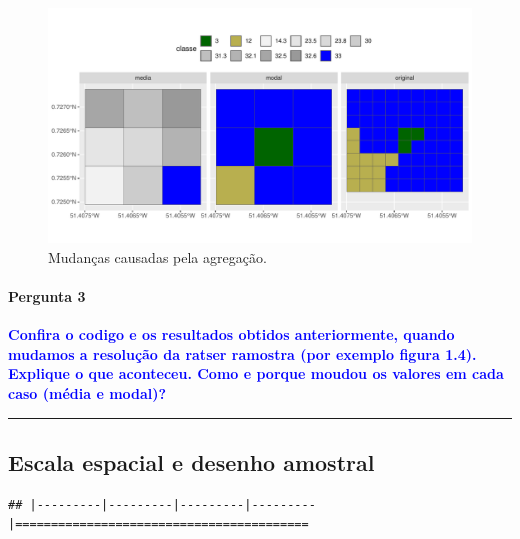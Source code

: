 \documentclass[
]{article}
\begin{document}
\begin{figure}
\centering
\includegraphics{epr_files/figure-latex/fig-mud-agg-1.pdf}
\caption{\label{fig:fig-mud-agg}Mudanças causadas pela agregação.}
\end{figure}

\hypertarget{pergunta-3}{%
\paragraph{Pergunta 3}\label{pergunta-3}}

\textcolor{blue}{\textbf{Confira o codigo e os resultados obtidos anteriormente, quando mudamos a resolução da ratser ramostra (por exemplo figura 1.4). Explique o que aconteceu. Como e porque moudou os valores em cada caso (média e modal)?}}

\begin{center}\rule{0.5\linewidth}{0.5pt}\end{center}

\newpage

\hypertarget{escala-espacial-e-desenho-amostral}{%
\subsection{Escala espacial e desenho amostral}\label{escala-espacial-e-desenho-amostral}}

\begin{verbatim}
## |---------|---------|---------|---------|=========================================                                          
\end{verbatim}
\end{document}
